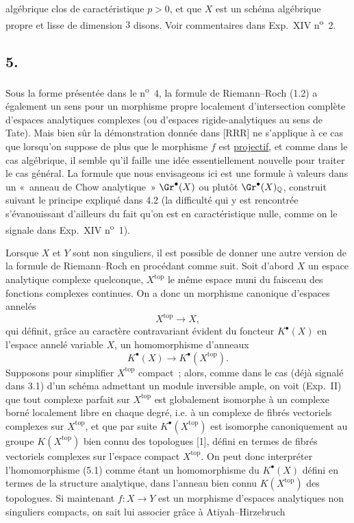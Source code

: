 alg\'ebrique clos de caract\'eristique $p>0$, et que $X$ est un sch\'ema alg\'ebrique propre et lisse de dimension $3$ disons. Voir commentaires dans Exp.\ XIV n\textsuperscript{o}~2.

\subsection*{5.}
Sous la forme pr\'esent\'ee dans le n\textsuperscript{o}~4, la formule de Riemann--Roch (1.2) a \'egalement un sens pour un morphisme propre localement d'intersection compl\`ete d'espaces analytiques complexes (ou d'espaces rigide-analytiques au sens de Tate). Mais bien s\^ur la d\'emonstration donn\'ee dans [RRR] ne s'applique \`a ce cas que lorsqu'on suppose de plus que le morphisme $f$ est \underline{projectif}, et comme dans le cas alg\'ebrique, il semble qu'il faille une id\'ee essentiellement nouvelle pour traiter le cas g\'en\'eral. La formule que nous envisageons ici est une formule \`a valeurs dans un «~anneau de Chow analytique~» $\Gr^\bullet(X)$ ou plut\^ot $\Gr^\bullet(X)_{\mathbb Q}$, construit suivant le principe expliqu\'e dans 4.2 (la difficult\'e qui y est rencontr\'ee s'\'evanouissant d'ailleurs du fait qu'on est en caract\'eristique nulle, comme on le signale dans Exp.\ XIV n\textsuperscript{o}~1).

Lorsque $X$ et $Y$ sont non singuliers, il est possible de donner une autre version de la formule de Riemann--Roch en proc\'edant comme suit. Soit d'abord $X$ un espace analytique complexe quelconque, $X^{\mathrm{top}}$ le m\^eme espace muni du faisceau des fonctions complexes continues. On a donc un morphisme canonique d'espaces annel\'es
\[
X^{\mathrm{top}}\longrightarrow X,
\]
qui d\'efinit, gr\^ace au caract\`ere contravariant \'evident du foncteur $K^\bullet(X)$ en l'espace annel\'e variable $X$, un homomorphisme d'anneaux
\begin{equation}\tag{5.1}
K^\bullet(X)\longrightarrow K^\bullet(X^{\mathrm{top}}).
\end{equation}
Supposons pour simplifier $X^{\mathrm{top}}$ compact~; alors, comme dans le cas (d\'ej\`a signal\'e dans 3.1) d'un sch\'ema admettant un module inversible ample, on voit (Exp.\ II) que tout complexe parfait sur $X^{\mathrm{top}}$ est globalement isomorphe \`a un complexe born\'e localement libre en chaque degr\'e, i.e. \`a un complexe de fibr\'es vectoriels complexes sur $X^{\mathrm{top}}$, et que par suite $K^\bullet(X^{\mathrm{top}})$ est isomorphe canoniquement au groupe $K(X^{\mathrm{top}})$ bien connu des topologues [1], d\'efini en termes de fibr\'es vectoriels complexes sur l'espace compact $X^{\mathrm{top}}$. On peut donc interpr\'eter l'homomorphisme (5.1) comme \'etant un homomorphisme du $K^\bullet(X)$ d\'efini en termes de la structure analytique, dans l'anneau bien connu $K(X^{\mathrm{top}})$ des topologues. Si maintenant $f:X\longrightarrow Y$ est un morphisme d'espaces analytiques non singuliers compacts, on sait lui associer gr\^ace \`a Atiyah--Hirzebruch 
